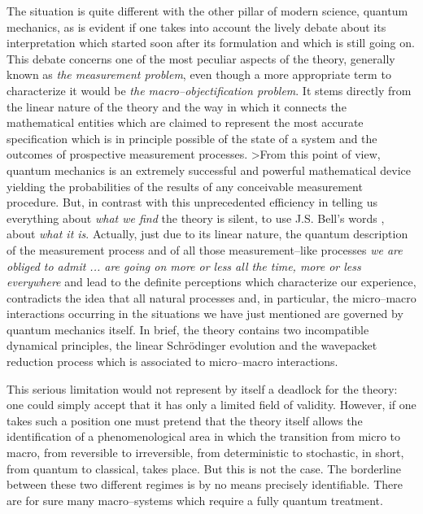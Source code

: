 \documentclass[12pt]{article}
\begin{document}
The situation is quite different with the other pillar of modern
science, quantum mechanics, as is evident if one takes into
account the lively debate about its interpretation which started
soon after its formulation and which is still going on. This
debate concerns one of the most peculiar aspects of the theory,
generally known as {\it the measurement problem}, even though a
more appropriate term to characterize it would be {\it the
macro--objectification problem}. It stems directly from the linear
nature of the theory and the way in which it connects the
mathematical entities which are claimed to represent the most
accurate specification which is in principle possible of the state
of a system and the outcomes of prospective measurement processes.
>From this point of view, quantum mechanics is an extremely
successful and powerful mathematical device yielding the
probabilities of the  results of any conceivable measurement
procedure. But, in contrast with this unprecedented efficiency in
telling us everything about {\it what we find} the theory is
silent, to use J.S. Bell's words \cite{bellam}, about {\it what it
is}. Actually, just due to its linear nature, the quantum
description of the measurement process and of all those
measurement--like processes \cite{bellam} {\it we are obliged to
admit ... are going on more or less all the time, more or less
everywhere} and lead to the definite perceptions which
characterize our experience, contradicts the idea that  all
natural processes and, in particular, the micro--macro
interactions occurring in the situations we have just mentioned
are governed by quantum mechanics itself. In brief, the theory
contains two incompatible dynamical principles, the linear
Schr\"odinger evolution and the wavepacket reduction  process
which is associated to micro--macro interactions.

This serious limitation would not represent by itself a deadlock
for the theory: one could simply accept that it has only a limited
field of validity. However, if one takes such a position one must
pretend that the theory itself allows the identification of a
phenomenological area in which the transition from micro to macro,
from reversible to irreversible, from deterministic to stochastic,
in short, from quantum to classical, takes place. But this is not
the case. The borderline between these two different regimes is by
no means precisely identifiable. There are for sure many
macro--systems which require a fully quantum treatment.
\end{document}
